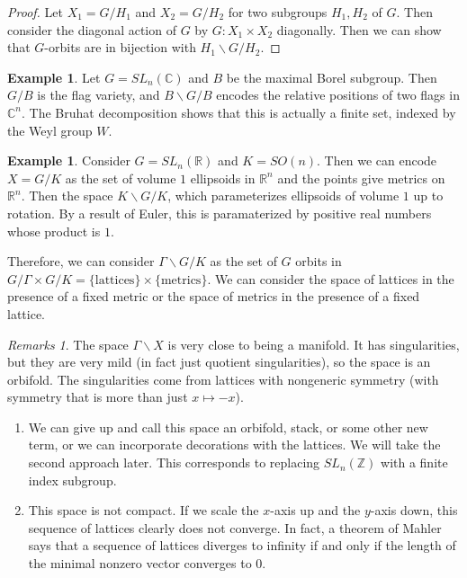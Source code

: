\documentclass[leqno, openany]{memoir}
\theoremstyle{definition}
\newtheorem{exm}[thm]{Example}
\theoremstyle{remark}
\newtheorem{rmks}[thm]{Remarks}
\theoremstyle{plain}
\theoremstyle{definition}
\theoremstyle{remark}
\newcommand{\R}{\mathbb{R}}
\newcommand{\C}{\mathbb{C}}
\newcommand{\Z}{\mathbb{Z}}
\begin{document}
\begin{proof}
    Let $X_1 = G/H_1$ and $X_2 = G/H_2$ for two subgroups $H_1,H_2$ of $G$. Then consider the diagonal action of $G$ by $G: X_1 \times X_2$ diagonally. Then we can show that $G$-orbits are in bijection with $H_1 \backslash G / H_2$.
\end{proof}

\begin{exm}
    Let $G = SL_n(\C)$ and $B$ be the maximal Borel subgroup. Then $G/B$ is the flag variety, and $B \backslash G / B$ encodes the relative positions of two flags in $\C^n$. The Bruhat decomposition shows that this is actually a finite set, indexed by the Weyl group $W$.
\end{exm}

\begin{exm}
    Consider $G = SL_n(\R)$ and $K = SO(n)$. Then we can encode $X = G/K$ as the set of volume $1$ ellipsoids in $\R^n$ and the points give metrics on $\R^n$. Then the space $K \backslash G / K$, which parameterizes ellipsoids of volume $1$ up to rotation. By a result of Euler, this is paramaterized by positive real numbers whose product is $1$.
\end{exm}

Therefore, we can consider $\Gamma \backslash G / K$ as the set of $G$ orbits in $G/\Gamma \times G/K = \{ \text{lattices} \} \times \{ \text{metrics} \}$. We can consider the space of lattices in the presence of a fixed metric or the space of metrics in the presence of a fixed lattice.

\begin{rmks}
    The space $\Gamma \backslash X$ is very close to being a manifold. It has singularities, but they are very mild (in fact just quotient singularities), so the space is an orbifold. The singularities come from lattices with nongeneric symmetry (with symmetry that is more than just $x \mapsto -x$).

    \begin{enumerate}
        \item We can give up and call this space an orbifold, stack, or some other new term, or we can incorporate decorations with the lattices. We will take the second approach later. This corresponds to replacing $SL_n(\Z)$ with a finite index subgroup.
        \item This space is not compact. If we scale the $x$-axis up and the $y$-axis down, this sequence of lattices clearly does not converge. In fact, a theorem of Mahler says that a sequence of lattices diverges to infinity if and only if the length of the minimal nonzero vector converges to $0$.
    \end{enumerate}
\end{rmks}
\end{document}

